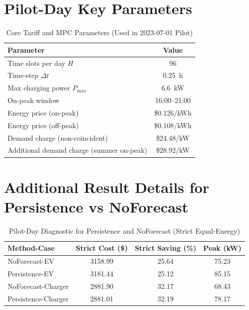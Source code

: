 \documentclass[journal]{IEEEtran}
\begin{document}
\section{Pilot-Day Key Parameters}
\begin{table}[h]
\caption{Core Tariff and MPC Parameters (Used in 2023-07-01 Pilot)}
\centering
\begin{tabular}{lc}
\toprule
Parameter & Value \\
\midrule
Time slots per day $H$ & 96 \\
Time-step $\Delta t$ & \SI{0.25}{h} \\
Max charging power $P_{\max}$ & \SI{6.6}{kW} \\
On-peak window & 16:00--21:00 \\
Energy price (on-peak) & \$0.126/kWh \\
Energy price (off-peak) & \$0.108/kWh \\
Demand charge (non-coincident) & \$24.48/kW \\
Additional demand charge (summer on-peak) & \$28.92/kW \\
\bottomrule
\end{tabular}
\label{tab:appendix_params}
\end{table}

\section{Additional Result Details for Persistence vs NoForecast}
\begin{table}[h]
\caption{Pilot-Day Diagnostic for Persistence and NoForecast (Strict Equal-Energy)}
\centering
\begin{tabular}{lccc}
\toprule
Method-Case & Strict Cost (\$) & Strict Saving (\%) & Peak (kW) \\
\midrule
NoForecast-EV & 3158.99 & 25.64 & 75.23 \\
Persistence-EV & 3181.44 & 25.12 & 85.15 \\
NoForecast-Charger & 2881.90 & 32.17 & 68.43 \\
Persistence-Charger & 2881.01 & 32.19 & 78.17 \\
\bottomrule
\end{tabular}
\label{tab:appendix_persistence}
\end{table}
\end{document}
